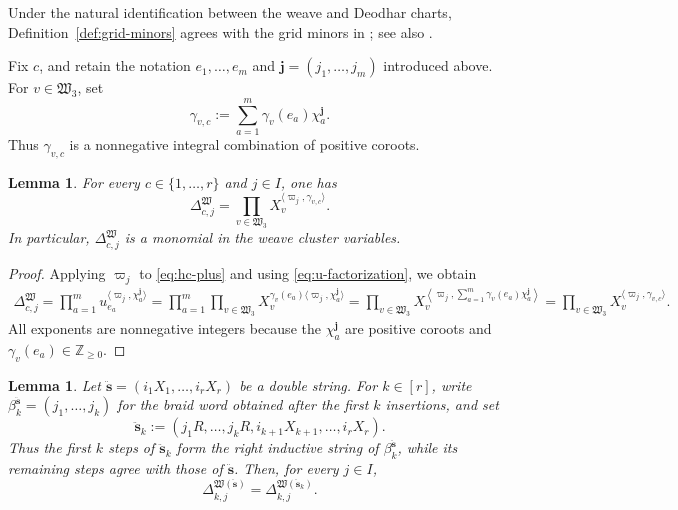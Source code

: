 \documentclass[12pt, reqno]{amsart}
\theoremstyle{plain}
\newtheorem{lemma}[theorem]{Lemma}
\theoremstyle{definition}
\numberwithin{equation}{section}
\newcommand{\ZZ}{\mathbb{Z}}
\begin{document}
Under the natural identification between the weave and Deodhar
charts, Definition~\ref{def:grid-minors} agrees with the grid minors
in \cite[Section~2.6]{galashin2026braidII}; see also
\cite[Definition~4.20 and Proposition~4.25]
{casals2025comparing}.

Fix \(c\), and retain the notation
\(e_1,\ldots,e_m\) and \(\mathbf j=(j_1,\ldots,j_m)\) introduced
above. For \(v\in\mathfrak W_3\), set
\begin{equation}\label{eq:def-gamma-vc}
    \gamma_{v,c}
    :=
    \sum_{a=1}^m
    \gamma_v(e_a)\chi_a^{\mathbf j}.
\end{equation}
Thus \(\gamma_{v,c}\) is a nonnegative integral combination of
positive coroots.

\begin{lemma}\label{lem:grid-minors}
For every \(c\in\{1,\ldots,r\}\) and \(j\in I\), one has
\begin{equation}\label{eq:grid-minor-cluster-monomial}
    \Delta_{c,j}^{\mathfrak W}
    =
    \prod_{v\in\mathfrak W_3}
    X_v^{\langle\varpi_j,\gamma_{v,c}\rangle}.
\end{equation}
In particular, \(\Delta_{c,j}^{\mathfrak W}\) is a monomial in the
weave cluster variables.
\end{lemma}

\begin{proof}
Applying \(\varpi_j\) to \eqref{eq:hc-plus} and using
\eqref{eq:u-factorization}, we obtain
\begin{align*}
    \Delta_{c,j}^{\mathfrak W}
    =
    \prod_{a=1}^m
    u_{e_a}^{\langle\varpi_j,\chi_a^{\mathbf j}\rangle} 
    =
    \prod_{a=1}^m\prod_{v\in\mathfrak W_3}
    X_v^{\gamma_v(e_a)
        \langle\varpi_j,\chi_a^{\mathbf j}\rangle} 
    =
    \prod_{v\in\mathfrak W_3}
    X_v^{
        \left\langle
            \varpi_j,
            \sum_{a=1}^m
            \gamma_v(e_a)\chi_a^{\mathbf j}
        \right\rangle} =
    \prod_{v\in\mathfrak W_3}
    X_v^{\langle\varpi_j,\gamma_{v,c}\rangle}.
\end{align*}
All exponents are nonnegative integers because the
\(\chi_a^{\mathbf j}\) are positive coroots and
\(\gamma_v(e_a)\in\ZZ_{\geq0}\).
\end{proof}



\begin{lemma}\label{lem:grid-minor-equation}
Let
\(
    \ddot{\mathbf s}
    =
    (i_1X_1,\ldots,i_rX_r)
\)
be a double string. For \(k\in[r]\), write
\(
    \beta_k^{\ddot{\mathbf s}}
    =
    (j_1,\ldots,j_k)
\)
for the braid word obtained after the first \(k\) insertions, and set
\[
    \ddot{\mathbf s}_k
    :=
    (j_1R,\ldots,j_kR,
      i_{k+1}X_{k+1},\ldots,i_rX_r).
\]
Thus the first \(k\) steps of \(\ddot{\mathbf s}_k\) form the right
inductive string of \(\beta_k^{\ddot{\mathbf s}}\), while its
remaining steps agree with those of \(\ddot{\mathbf s}\). Then, for
every \(j\in I\),
\[
    \Delta_{k,j}^{\mathfrak W(\ddot{\mathbf s})}
    =
    \Delta_{k,j}^{\mathfrak W(\ddot{\mathbf s}_k)}.
\]
\end{lemma}
\end{document}
